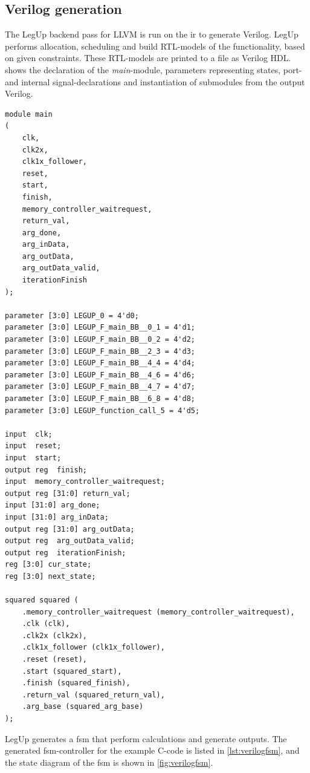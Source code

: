 \subsection{Verilog generation}
The LegUp backend pass for LLVM is run on the \gls{ir} to generate Verilog. LegUp performs allocation, scheduling and build RTL-models of the functionality, based on given constraints. These RTL-models are printed to a file as Verilog HDL.  shows the declaration of the \textit{main}-module, parameters representing states, port- and internal signal-declarations and instantiation of submodules from the output Verilog.
\clearpage
\lstset{language=Verilog, style=VerilogStyle}
\begin{lstlisting}[caption={Verilog module, port, signal and parameter declaration, and sub-module instantiation},label=lst:verilogmodule1]
module main
(
	clk,
	clk2x,
	clk1x_follower,
	reset,
	start,
	finish,
	memory_controller_waitrequest,
	return_val,
	arg_done,
	arg_inData,
	arg_outData,
	arg_outData_valid,
	iterationFinish
);

parameter [3:0] LEGUP_0 = 4'd0;
parameter [3:0] LEGUP_F_main_BB__0_1 = 4'd1;
parameter [3:0] LEGUP_F_main_BB__0_2 = 4'd2;
parameter [3:0] LEGUP_F_main_BB__2_3 = 4'd3;
parameter [3:0] LEGUP_F_main_BB__4_4 = 4'd4;
parameter [3:0] LEGUP_F_main_BB__4_6 = 4'd6;
parameter [3:0] LEGUP_F_main_BB__4_7 = 4'd7;
parameter [3:0] LEGUP_F_main_BB__6_8 = 4'd8;
parameter [3:0] LEGUP_function_call_5 = 4'd5;

input  clk;
input  reset;
input  start;
output reg  finish;
input  memory_controller_waitrequest;
output reg [31:0] return_val;
input [31:0] arg_done;
input [31:0] arg_inData;
output reg [31:0] arg_outData;
output reg  arg_outData_valid;
output reg  iterationFinish;
reg [3:0] cur_state;
reg [3:0] next_state;

squared squared (
	.memory_controller_waitrequest (memory_controller_waitrequest),
	.clk (clk),
	.clk2x (clk2x),
	.clk1x_follower (clk1x_follower),
	.reset (reset),
	.start (squared_start),
	.finish (squared_finish),
	.return_val (squared_return_val),
	.arg_base (squared_arg_base)
);
\end{lstlisting}
LegUp generates a \gls{fsm} that perform calculations and generate outputs. The generated \gls{fsm}-controller for the example C-code is listed in \cref{lst:verilogfsm}, and the state diagram of the \gls{fsm} is shown in \cref{fig:verilogfsm}.
